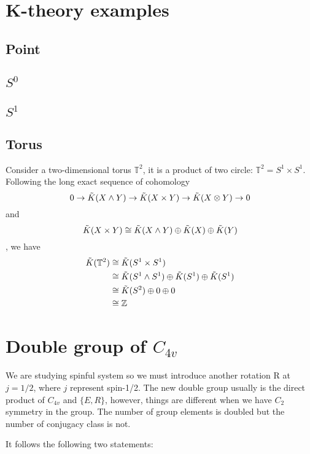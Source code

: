 \chapter{K-theory examples}
\section{Point}
\section{$S^0$}
\section{$S^1$}
\section{Torus}

Consider a two-dimensional torus $\mathbb{T}^2$, it is a product of two circle: $\mathbb{T}^2 = S^1 \times S^1 $. Following the long exact sequence of cohomology
\begin{equation}
    0\rightarrow \Tilde{K}(X\wedge Y)\rightarrow
    \Tilde{K}(X\times Y)\rightarrow \Tilde{K}(X\otimes Y)\rightarrow 0
\end{equation}
and $$\Tilde{K}(X \times Y)\cong \Tilde{K}(X \wedge Y)\oplus \Tilde{K}(X)\oplus\Tilde{K}(Y)$$,
we have \begin{align}
    \Tilde{K}(\mathbb{T}^2) &\cong \Tilde{K}(S^1 \times S^1)\\
    &\cong \Tilde{K}(S^1 \wedge S^1)\oplus \Tilde{K}(S^1)\oplus\Tilde{K}(S^1)\\
    &\cong\Tilde{K}(S^2)\oplus0\oplus0\\
    &\cong \mathbb{Z}
\end{align}
\newpage
\cleardoublepage

\chapter{Double group of $C_{4v}$}

We are studying spinful system so we must introduce another rotation R at $j=1/2$, where $j$ represent spin-1/2. The new double group usually is the direct product of $C_{4v}$ and $\{E, R\}$, however, things are different when we have $C_2$ symmetry in the group. The number of group elements is doubled but the number of conjugacy class is not.

It follows the following two statements:

